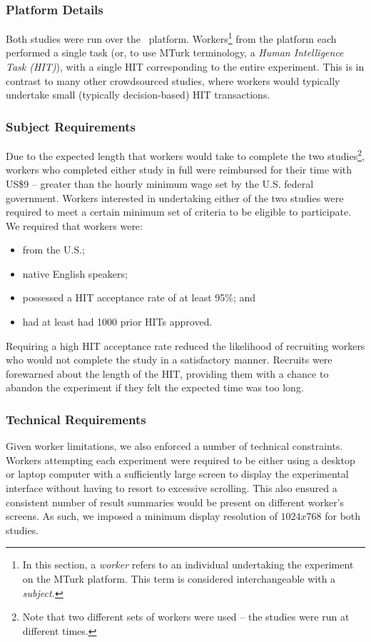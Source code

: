 \subsubsection{Platform Details}\label{sec:methodology:user:crowdsourcing:platform}
Both studies were run over the~ platform. Workers\footnote{In this section, a \emph{worker} refers to an individual undertaking the experiment on the MTurk platform. This term is considered interchangeable with a \emph{subject.}} from the platform each performed a single task (or, to use MTurk terminology, a \emph{Human Intelligence Task (HIT)}), with a single HIT corresponding to the entire experiment. This is in contrast to many other crowdsourced studies, where workers would typically undertake small (typically decision-based) HIT transactions.

\subsubsection{Subject Requirements}\label{sec:methodology:user:crowdsourcing:subjects}
Due to the expected length that workers would take to complete the two studies\footnote{Note that two different sets of workers were used -- the studies were run at different times.}, workers who completed either study in full were reimbursed for their time with US\$9 -- greater than the hourly minimum wage set by the U.S. federal government. Workers interested in undertaking either of the two studies were required to meet a certain minimum set of criteria to be eligible to participate. We required that workers were:

\begin{itemize}
    \item{from the U.S.;}
    \item{native English speakers;}
    \item{possessed a HIT acceptance rate of at least 95\%; and}
    \item{had at least had 1000 prior HITs approved.}
\end{itemize}

Requiring a high HIT acceptance rate reduced the likelihood of recruiting workers who would not complete the study in a satisfactory manner. Recruits were forewarned about the length of the HIT, providing them with a chance to abandon the experiment if they felt the expected time was too long.

\subsubsection{Technical Requirements}\label{sec:methodology:user:crowdsourcing:technical}
Given worker limitations, we also enforced a number of technical constraints. Workers attempting each experiment were required to be either using a desktop or laptop computer with a sufficiently large screen to display the experimental interface without having to resort to excessive scrolling. This also ensured a consistent number of result summaries would be present on different worker's screens. As such, we imposed a minimum display resolution of $1024x768$ for both studies. 

